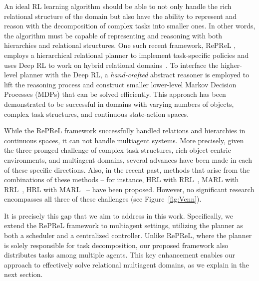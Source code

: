 An ideal RL learning algorithm should be able to not only handle the rich relational structure of the domain but also have the ability to represent and reason with the decomposition of complex tasks into smaller ones. In other words, the algorithm must be capable of representing and reasoning with both hierarchies and relational structures. 
One such recent framework, RePReL \citep{kokel2021reprel}, employs a hierarchical relational planner to implement task-specific policies and uses Deep RL to work on hybrid relational domains~\citep{kokel2021reprel,kokel2022Journal}. To interface the higher-level planner with the Deep RL, a {\em hand-crafted} abstract reasoner is employed to lift the reasoning process and construct smaller lower-level Markov Decision Processes (MDPs) that can be solved efficiently. This approach has been demonstrated to be successful in domains with varying numbers of objects, complex task structures, and continuous state-action spaces. 

While the RePReL framework successfully handled relations and hierarchies in continuous spaces, it can not handle multiagent systems. More precisely, given the three-pronged challenge of complex task structures, rich object-centric environments, and multiagent 
domains, several advances have been made in each of these specific directions. Also, in the recent past, methods that arise from the combinations of these methods -- for instance, HRL with RRL~\citep{tadepalli_hrrl, maxq, kokel2021reprel}, MARL with RRL~\citep{marrl, marl_ilp}, HRL with MARL~\citep{hmarl, hsd, haven, alma} -- have been proposed. However, no significant research encompasses all three of these challenges (see Figure~\ref{fig:Venn}).

It is precisely this gap that we aim to address in this work. Specifically, we extend the RePReL framework to multiagent settings, utilizing the planner as both a scheduler and a centralized controller. Unlike RePReL, where the planner is solely responsible for task decomposition, our proposed framework also distributes tasks among multiple agents. This key enhancement enables our approach to effectively solve relational multiagent domains, as we explain in the next section.
